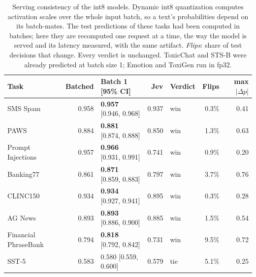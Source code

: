 \begin{table}[t]
\centering\small
\setlength{\tabcolsep}{4pt}
\begin{tabular}{lrlrlrr}
\toprule
Task & Batched & Batch 1 [95\% CI] & Jev & Verdict & Flips & max $|\Delta p|$ \\
\midrule
SMS Spam & 0.958 & \textbf{0.957} {\scriptsize[0.946, 0.968]} & 0.937 & win & 0.3\% & 0.41 \\
PAWS & 0.884 & \textbf{0.881} {\scriptsize[0.874, 0.888]} & 0.850 & win & 1.3\% & 0.63 \\
Prompt Injections & 0.957 & \textbf{0.966} {\scriptsize[0.931, 0.991]} & 0.741 & win & 0.9\% & 0.20 \\
Banking77 & 0.861 & \textbf{0.871} {\scriptsize[0.859, 0.883]} & 0.797 & win & 3.7\% & 0.76 \\
CLINC150 & 0.934 & \textbf{0.934} {\scriptsize[0.927, 0.941]} & 0.895 & win & 0.3\% & 0.28 \\
AG News & 0.893 & \textbf{0.893} {\scriptsize[0.886, 0.900]} & 0.885 & win & 1.5\% & 0.54 \\
Financial PhraseBank & 0.794 & \textbf{0.818} {\scriptsize[0.792, 0.842]} & 0.731 & win & 9.5\% & 0.72 \\
SST-5 & 0.583 & 0.580 {\scriptsize[0.559, 0.600]} & 0.579 & tie & 5.1\% & 0.25 \\
\bottomrule
\end{tabular}
\caption{Serving consistency of the int8 models. Dynamic int8 quantization computes activation scales over the whole input batch, so a text's probabilities depend on its batch-mates. The test predictions of these tasks had been computed in batches; here they are recomputed one request at a time, the way the model is served and its latency measured, with the same artifact. \emph{Flips}: share of test decisions that change. Every verdict is unchanged. ToxicChat and STS-B were already predicted at batch size 1; Emotion and ToxiGen run in fp32.}
\label{tab:batch1}
\end{table}
